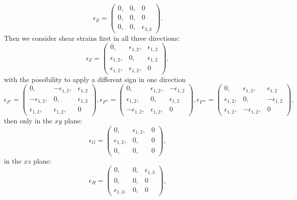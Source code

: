 \documentclass[12pt,a4paper]{article}
\begin{document}
\begin{equation}
\epsilon_E=\left( \begin{array}{ccc}
0, & 0, & 0 
\\
0, & 0, & 0 
\\
0, & 0, & \epsilon_{3,3}
\end{array}
\right).
\end{equation}
Then we consider shear strains first in all three directions:
\begin{equation}
\epsilon_F=\left( \begin{array}{ccc}
0, & \epsilon_{1,2}, & \epsilon_{1,2}
\\
\epsilon_{1,2}, & 0, & \epsilon_{1,2} 
\\
\epsilon_{1,2}, & \epsilon_{1,2}, & 0
\end{array}
\right),
\end{equation}
with the possibility to apply a different sign in one direction
\begin{equation}
\epsilon_{F'}=\left( \begin{array}{ccc}
0, & -\epsilon_{1,2}, & \epsilon_{1,2}
\\
-\epsilon_{1,2}, & 0, & \epsilon_{1,2} 
\\
\epsilon_{1,2}, & \epsilon_{1,2}, & 0
\end{array}
\right),
\epsilon_{F''}=\left( \begin{array}{ccc}
0, & \epsilon_{1,2}, & -\epsilon_{1,2}
\\
\epsilon_{1,2}, & 0, & \epsilon_{1,2} 
\\
-\epsilon_{1,2}, & \epsilon_{1,2}, & 0
\end{array}
\right),
\epsilon_{F'''}=\left( \begin{array}{ccc}
0, & \epsilon_{1,2}, & \epsilon_{1,2}
\\
\epsilon_{1,2}, & 0, & -\epsilon_{1,2} 
\\
\epsilon_{1,2}, & -\epsilon_{1,2}, & 0
\end{array}
\right),
\end{equation}
then only in the $xy$ plane:
\begin{equation}
\epsilon_G=\left( \begin{array}{ccc}
0, & \epsilon_{1,2}, & 0
\\
\epsilon_{1,2}, & 0, & 0
\\
0, & 0, & 0
\end{array}
\right),
\end{equation}
in the $xz$ plane:
\begin{equation}
\epsilon_H=\left( \begin{array}{ccc}
0, & 0, & \epsilon_{1,3}
\\
0, & 0, & 0
\\
\epsilon_{1,3}, & 0, & 0
\end{array}
\right),
\end{equation}
\end{document}
